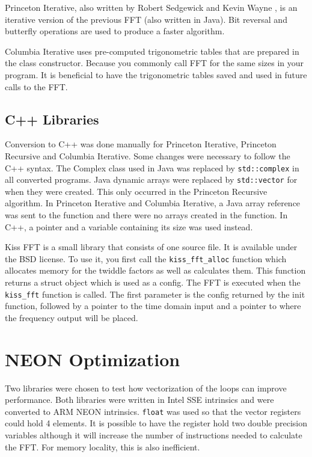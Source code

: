 Princeton Iterative, also written by Robert Sedgewick and Kevin Wayne \cite{princeton:iterative}, is an iterative version of the previous FFT (also written in Java). Bit reversal and butterfly operations are used to produce a faster algorithm. 

Columbia Iterative \cite{columbia:iterative} uses pre-computed trigonometric tables that are prepared in the class constructor. Because you commonly call FFT for the same sizes in your program. It is beneficial to have the trigonometric tables saved and used in future calls to the FFT.

\subsection{C++ Libraries}
Conversion to C++ was done manually for Princeton Iterative, Princeton Recursive and Columbia Iterative. Some changes were necessary to follow the C++ syntax. The Complex class used in Java was replaced by \texttt{std::complex} in all converted programs. Java dynamic arrays were replaced by \texttt{std::vector} for when they were created. This only occurred in the Princeton Recursive algorithm. In Princeton Iterative and Columbia Iterative, a Java array reference was sent to the function and there were no arrays created in the function. In C++, a pointer and a variable containing its size was used instead. 

Kiss FFT is a small library that consists of one source file. It is available under the BSD license. To use it, you first call the \texttt{kiss\_fft\_alloc} function which allocates memory for the twiddle factors as well as calculates them. This function returns a struct object which is used as a config. The FFT is executed when the \texttt{kiss\_fft} function is called. The first parameter is the config returned by the init function, followed by a pointer to the time domain input and a pointer to where the frequency output will be placed.



\section{NEON Optimization}

Two libraries were chosen to test how vectorization of the loops can improve performance. Both libraries were written in Intel SSE intrinsics and were converted to ARM NEON intrinsics. \texttt{float} was used so that the vector registers could hold 4 elements. It is possible to have the register hold two double precision variables although it will increase the number of instructions needed to calculate the FFT. For memory locality, this is also inefficient.

